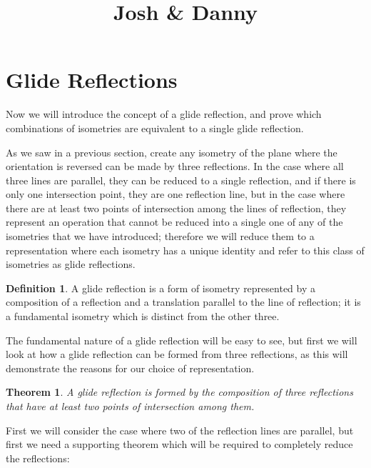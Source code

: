 \documentclass[11pt]{article}
\newtheorem{theorem}{Theorem}[section]
\theoremstyle{definition}
\newtheorem{definition}[]{Definition}
\begin{document}


\title{Josh \& Danny}

\maketitle

\section{Glide Reflections}
Now we will introduce the concept of a glide reflection, and prove which
combinations of isometries are equivalent to a single glide reflection.

As we saw in a previous section, create any isometry of the plane where the
orientation is reversed can be made by three reflections. In the case where all
three lines are parallel, they can be reduced to a single reflection, and if
there is only one intersection point, they are one reflection line, but in the
case where there are at least two points of intersection among the lines of
reflection, they represent an operation that cannot be reduced into a single
one of any of the isometries that we have introduced; therefore we will reduce
them to a representation where each isometry has a unique identity and refer to
this class of isometries as glide reflections.

\begin{definition}\label{glide reflection}
  A glide reflection is a form of isometry represented by a composition of a
reflection and a translation parallel to the line of reflection; it is a
fundamental isometry which is distinct from the other three.
\end{definition}

The fundamental nature of a glide reflection will be easy to see, but first we
will look at how a glide reflection can be formed from three reflections, as
this will demonstrate the reasons for our choice of representation.

\begin{theorem}\label{3 reflections form a glide reflection}
  A glide reflection is formed by the composition of three reflections that
  have at least two points of intersection among them.
\end{theorem}

First we will consider the case where two of the reflection lines are parallel,
but first we need a supporting theorem which will be required to completely
reduce the reflections:
\end{document}
